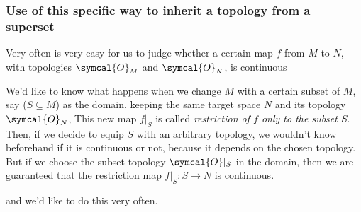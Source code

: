  \subsubsection{Use of this specific way to inherit a topology from a superset}
 Very often is very easy for us to judge whether a certain map $f$ from $M$ to $N$,
 with topologies $\symcal{O}_M$ and $\symcal{O}_N$, is continuous
 \vspace{-2ex}
 \begin{center}
   \def\scl{1}
   \centering
   \end{center}

 We'd like to know what happens when we change $M$ with a certain subset of $M$, say
 ($S\subseteq M$) as the domain, keeping the same target space $N$ and its topology
 $\symcal{O}_N$, This new map $f|_S$ is called \emph{restriction of $f$ only to the
   subset $S$}.
 Then, if we decide to equip $S$ with an arbitrary topology, we wouldn't know
 beforehand if it
 is continuous or not, because it depends on the chosen topology.
 But if we choose the subset topology $\symcal{O}|_S$ in the domain, then we are
 guaranteed that
 the restriction map $f|_S : S \longrightarrow N$ is continuous.
 \vspace{-1.0ex}
 \begin{center}
   \def\scl{1}
   \centering
   \end{center}
   and we'd like to do this very often.

